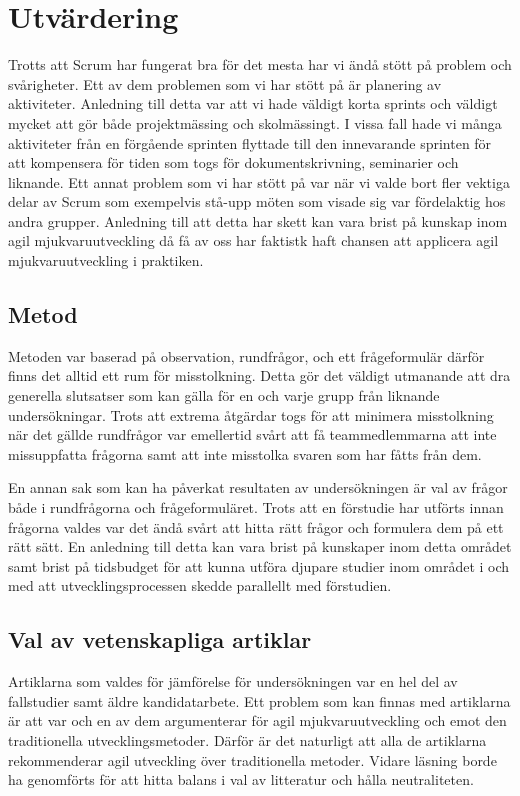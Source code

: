 \section{Utvärdering}
Trotts att Scrum har fungerat bra för det mesta har vi ändå stött på problem och svårigheter. Ett av dem problemen som vi har stött på är planering av aktiviteter. Anledning till detta var att vi hade väldigt korta sprints och väldigt mycket att gör både projektmässing och skolmässingt. I vissa fall hade vi många aktiviteter från en förgående sprinten flyttade till den innevarande sprinten för att kompensera för tiden som togs för dokumentskrivning, seminarier och liknande. Ett annat problem som vi har stött på var när vi valde bort fler vektiga delar av Scrum som exempelvis stå-upp möten som visade sig var fördelaktig hos andra grupper. Anledning till att detta har skett kan vara brist på kunskap inom agil mjukvaruutveckling då få av oss har faktistk haft chansen att applicera agil mjukvaruutveckling i praktiken. 

\subsection{Metod}
Metoden var baserad på observation, rundfrågor, och ett frågeformulär därför finns det alltid ett rum för misstolkning. Detta gör det väldigt utmanande att dra generella slutsatser som kan gälla för en och varje grupp från liknande undersökningar. Trots att extrema åtgärdar togs för att minimera misstolkning när det gällde rundfrågor var emellertid svårt att få teammedlemmarna att inte missuppfatta frågorna samt att inte misstolka svaren som har fåtts från dem. 

En annan sak som kan ha påverkat resultaten av undersökningen är val av frågor både i rundfrågorna och frågeformuläret. Trots att en förstudie har utförts innan frågorna valdes var det ändå svårt att hitta rätt frågor och formulera dem på ett rätt sätt. En anledning till detta kan vara brist på kunskaper inom detta området samt brist på tidsbudget för att kunna utföra djupare studier inom området i och med att utvecklingsprocessen skedde parallellt med förstudien. 

\subsection{Val av vetenskapliga artiklar}
Artiklarna som valdes för jämförelse för undersökningen var en hel del av fallstudier samt äldre kandidatarbete. Ett problem som kan finnas med artiklarna är att var och en av dem argumenterar för agil mjukvaruutveckling och emot den traditionella utvecklingsmetoder. Därför är det naturligt att alla de artiklarna rekommenderar agil utveckling över traditionella metoder. Vidare läsning borde ha genomförts för att hitta balans i val av litteratur och hålla neutraliteten. 